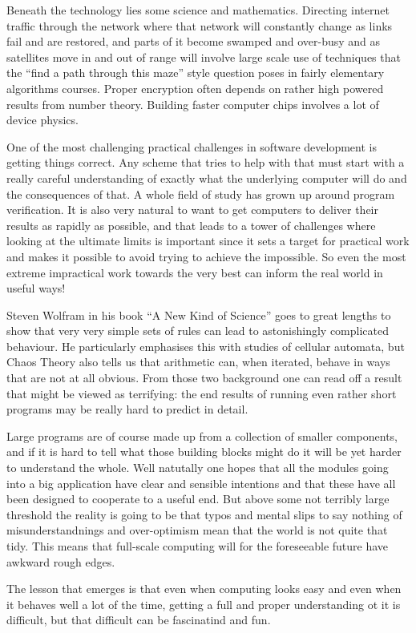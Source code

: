 Beneath the technology lies some science and mathematics. Directing
internet traffic through the network where that network will constantly
change as links fail and are restored, and parts of it become swamped
and over-busy and as satellites move in and out of range will involve
large scale use of techniques that the ``find a path through this maze''
style question poses in fairly elementary algorithms courses. Proper
encryption often depends on rather high powered results from number
theory. Building faster computer chips involves a lot of device physics.

One of the most challenging practical challenges in software development is
getting things correct. Any scheme that tries to help with that must start
with a really careful understanding of exactly what the underlying computer
will do and the consequences of that. A whole field of study has grown
up around program verification. It is also very natural to want to get
computers to deliver their results as rapidly as possible, and that leads
to a tower of challenges where looking at the ultimate limits is important
since it sets a target for practical work and makes it possible to avoid
trying to achieve the impossible. So even the most extreme impractical
work towards the very best can inform the real world in useful ways!

Steven Wolfram in his book ``A New Kind of Science''\cite{ANKoS} goes
to great lengths to show that very very simple sets of rules can lead to
astonishingly complicated behaviour. He particularly emphasises this
with studies of cellular automata, but Chaos Theory\cite{chaos} also
tells us that arithmetic can, when iterated, behave in ways that are not
at all obvious. From those two background one can read off a result that
might be viewed as terrifying: the end results of running even rather
short programs may be really hard to predict in detail.

Large programs are of course made up from a collection of smaller
components, and if it is hard to tell what those building blocks might
do it will be yet harder to understand the whole. Well natutally
one hopes that all the modules going into a big application have clear
and sensible intentions and that these have all been designed to
cooperate to a useful end. But above some not terribly large threshold
the reality is going to be that typos and mental slips to say nothing
of misunderstandnings and over-optimism mean that the world is not quite
that tidy. This means that full-scale computing will for the foreseeable
future have awkward rough edges.

The lesson that emerges is that even when computing looks easy and
even when it behaves well a lot of the time, getting a full and proper
understanding ot it is difficult, but that difficult can be fascinatind
and fun.








